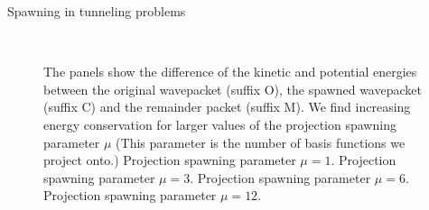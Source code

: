 \begin{chapter}{Spawning in tunneling problems}
\begin{figure}[h!]
{  } \\
  \caption[Energy difference of the original and spawned wavepackets using the projection spawning method]{
  The panels show the difference of the kinetic and potential energies between the
  original wavepacket (suffix O), the spawned wavepacket (suffix C) and the remainder
  packet (suffix M). We find increasing energy conservation for larger values of the
  projection spawning parameter $\mu$ (This parameter is the number of basis functions we project onto.)
   Projection spawning parameter $\mu = 1$.
   Projection spawning parameter $\mu = 3$.
   Projection spawning parameter $\mu = 6$.
   Projection spawning parameter $\mu = 12$.
  \label{fig:tunnel_spawn_project_K50_spawn_energies_drift}
  }
\end{figure}



\end{chapter}
